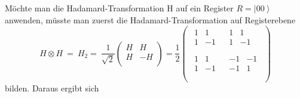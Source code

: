Möchte man die Hadamard-Transformation H auf ein Register $R=\left|00\right\rangle$ anwenden, müsste man zuerst die Hadamard-Transformation auf Registerebene 
\begin{equation}
    H\otimes H\ =\ H_2=\ \frac{1}{\sqrt2}\left(\begin{matrix}H&H\\H&-H\\\end{matrix}\right)=\frac{1}{2}\left(\begin{matrix}\begin{matrix}1&1\\1&-1\\\end{matrix}&\begin{matrix}1&1\\1&-1\\\end{matrix}\\\begin{matrix}1&1\\1&-1\\\end{matrix}&\begin{matrix}-1&-1\\-1&1\\\end{matrix}\\\end{matrix}\right)
\end{equation}
bilden. Daraus ergibt sich
